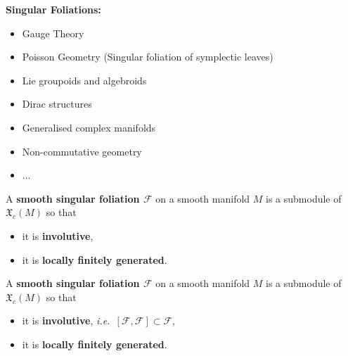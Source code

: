 \documentclass[
aspectratio=3218, 
10pt
]{beamer}
\theoremstyle{plain}
\theoremstyle{remark}
\begin{document}

\begin{frame}
\textbf{Singular Foliations:}

\begin{itemize}
	\item Gauge Theory
	\item Poisson Geometry \newline (Singular foliation of symplectic leaves)
	\item Lie groupoids and algebroids
	\item Dirac structures
	\item Generalised complex manifolds
	\item Non-commutative geometry
	\item $\dotsc$
\end{itemize}

\end{frame}



\begin{frame}
\begin{definition}\vspace{.5pt}
A \textbf{smooth singular foliation $\mathcal{F}$} on a smooth manifold $M$ is a submodule of $\mathfrak{X}_c(M)$ so that
\begin{itemize}
	\item it is \textbf{involutive},
	\item it is \textbf{locally finitely generated}.
\end{itemize}
\end{definition}
\end{frame}

\begin{frame}
\begin{definition}\vspace{.5pt}
A \textbf{smooth singular foliation $\mathcal{F}$} on a smooth manifold $M$ is a submodule of $\mathfrak{X}_c(M)$ so that
\begin{itemize}
	\item it is \textbf{involutive}, \textit{i.e.\ $[\mathcal{F}, \mathcal{F}] \subset \mathcal{F}$},
	\item it is \textbf{locally finitely generated}.
\end{itemize}
\end{definition}
\end{frame}
\end{document}

